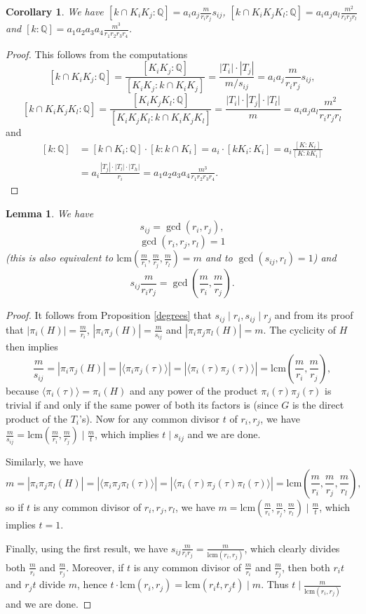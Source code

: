 \documentclass[12pt,a4paper]{article}
\newtheorem{lemma}[theorem]{Lemma}
\newtheorem{cor}[theorem]{Corollary}
\newcommand{\Q}{\mathbb{Q}}
\newcommand{\lcm}{\mathrm{lcm}}
\begin{document}
\begin{cor}\label{compcap}
We have $[k\cap K_iK_j:\Q]=a_ia_j\frac{m}{r_ir_j}s_{ij}$, $[k\cap K_iK_jK_l:\Q]=a_ia_ja_l\frac{m^2}{r_ir_jr_l}$ and $[k:\Q]=a_1a_2a_3a_4\frac{m^3}{r_1r_2r_3r_4}$.
\end{cor}
\begin{proof}
This follows from the computations
$$[k\cap K_iK_j:\Q]=\frac{[K_iK_j:\Q]}{[K_iK_j:k\cap K_iK_j]}=\frac{|T_i|\cdot|T_j|}{m/s_{ij}}=a_ia_j\frac{m}{r_ir_j}s_{ij},$$
$$[k\cap K_iK_jK_l:\Q]=\frac{[K_iK_jK_l:\Q]}{[K_iK_jK_l:k\cap K_iK_jK_l]}=\frac{|T_i|\cdot|T_j|\cdot|T_l|}{m}=a_ia_ja_l\frac{m^2}{r_ir_jr_l}$$
and
\begin{equation*}
\begin{split}
[k:\Q]&=[k\cap K_i:\Q]\cdot [k:k\cap K_i]=a_i\cdot [kK_i:K_i]=a_i\frac{[K:K_i]}{[K:kK_i]}\\
&=a_i\frac{|T_j|\cdot|T_l|\cdot|T_h|}{r_i}=
a_1a_2a_3a_4\frac{m^3}{r_1r_2r_3r_4}.
\end{split}
\end{equation*}

\end{proof}
\begin{lemma}\label{coprime}
We have $$s_{ij}=\gcd(r_i,r_j),$$ $$\gcd(r_i,r_j,r_l)=1$$ (this is also equivalent to $\lcm\left(\frac{m}{r_i},\frac{m}{r_j},\frac{m}{r_l}\right)=m$ and to $\gcd(s_{ij},r_l)=1$) and $$s_{ij}\frac{m}{r_ir_j}=\gcd(\frac{m}{r_i},\frac{m}{r_j}).$$
\end{lemma}
\begin{proof}
It follows from Proposition \ref{degrees} that $s_{ij}\mid r_i, s_{ij}\mid r_j$ and from its proof that $|\pi_i(H)|=\frac{m}{r_i}$, $|\pi_i\pi_j(H)|=\frac{m}{s_{ij}}$ and $|\pi_i\pi_j\pi_l(H)|=m$. The cyclicity of $H$ then implies
$$\frac{m}{s_{ij}}=|\pi_i\pi_j(H)|=|\langle\pi_i\pi_j(\tau)\rangle|=|\langle\pi_i(\tau)\pi_j(\tau)\rangle|=\lcm\left(\frac{m}{r_i},\frac{m}{r_j}\right),$$
because $\langle\pi_i(\tau)\rangle=\pi_i(H)$ and any power of the product $\pi_i(\tau)\pi_j(\tau)$ is trivial if and only if the same power of both its factors is (since $G$ is the direct product of the $T_i$'s). 
Now for any common divisor $t$ of $r_i,r_j$, we have $\frac{m}{s_{ij}}= \lcm\left(\frac{m}{r_i},\frac{m}{r_j}\right) \mid \frac{m}{t}$, which implies $t\mid s_{ij}$ and we are done.

Similarly, we have
$$m=|\pi_i\pi_j\pi_l(H)|=|\langle\pi_i\pi_j\pi_l(\tau)\rangle|=|\langle\pi_i(\tau)\pi_j(\tau)\pi_l(\tau)\rangle|=\lcm\left(\frac{m}{r_i},\frac{m}{r_j},\frac{m}{r_l}\right),$$
so if $t$ is any common divisor of $r_i,r_j,r_l$, we have $m=\lcm\left(\frac{m}{r_i},\frac{m}{r_j},\frac{m}{r_l}\right)\mid \frac{m}{t}$, which implies $t=1$.

Finally, using the first result, we have $s_{ij}\frac{m}{r_ir_j}=\frac{m}{\lcm(r_i,r_j)}$, which clearly divides both $\frac{m}{r_i}$ and $\frac{m}{r_j}$. Moreover, if $t$ is any common divisor of $\frac{m}{r_i}$ and $\frac{m}{r_j}$, then both $r_it$ and $r_jt$ divide $m$, hence $t\cdot\lcm(r_i,r_j)=\lcm(r_it,r_jt)\mid m$. Thus $t\mid \frac{m}{\lcm(r_i,r_j)}$ and we are done.
\end{proof}
\end{document}
